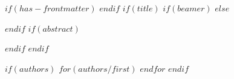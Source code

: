$if(has-frontmatter)$
\frontmatter
$endif$
$if(title)$
$if(beamer)$
\frame{\titlepage}
$else$
\maketitle
$endif$
$if(abstract)$
\begin{abstract}
    $abstract$
\end{abstract}
$endif$
$endif$

$if(authors)$
$for(authors/first)$
$endfor$
$endif$
\thispagestyle{fancy}
